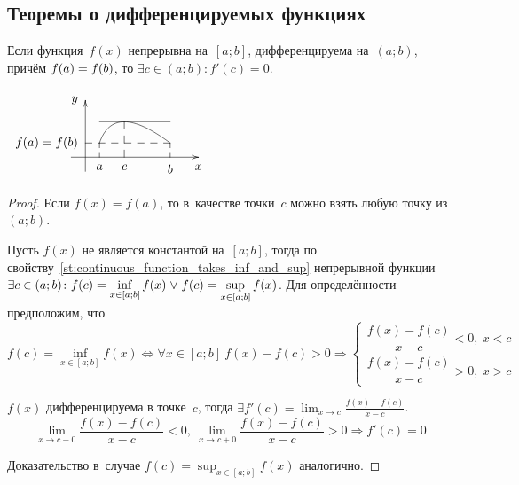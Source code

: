 \subsection{Теоремы о дифференцируемых функциях}
\begin{theorem}[Ролля]
Если функция~$f(x)$ непрерывна на~$[a; b]$, дифференцируема на~$(a; b)$, причём $f(a) \opbr= f(b)$, то $\exists c \in (a; b) \colon f'(c) = 0$.
\end{theorem}
\begin{center}
\noindent
$\begin{xy} /r8mm/:
(-0.5, 0); (4, 0) **@{-} *@{>} *++!U{x};
(0, -0.5); (0, 2) **@{-} *@{>} *++!R{y};
(0.5, 0.5) = "a"; (3, 0.5) = "b" **\crv{(1, 2)};
"a"; (0.5, 0) **@{--} *++!U{a};
"b"; (3, 0) **@{--} *++!U{b};
"b"; (0, 0.5) **@{--} *++!R{f(a) = f(b)};
(0.5, 1.2515); (3, 1.2515) **@{-};
(1.377, 1.2515); (1.377, 0) **@{--} *++!U{c};
\end{xy}$
\end{center}
\begin{proof}
Если $f(x) = f(a)$, то в~качестве точки~$c$ можно взять любую точку из~$(a; b)$.

Пусть $f(x)$ не является константой на~$[a; b]$, тогда по свойству~\ref{st:continuous_function_takes_inf_and_sup} непрерывной функции $\displaystyle \exists c \in (a; b) \colon \allowbreak f(c) \opbr= \inf_{x \in [a; b]} f(x) \lOr f(c) = \sup_{x \in [a; b]} f(x)$.
Для определённости предположим, что
\begin{equation*}
f(c) = \inf_{x \in [a; b]} f(x) \Leftrightarrow
\forall x \in [a; b] \ f(x) - f(c) > 0 \Rightarrow
\begin{cases}
\dfrac{f(x) - f(c)}{x - c} < 0, \ x < c \\
\dfrac{f(x) - f(c)}{x - c} > 0, \ x > c
\end{cases}
\end{equation*}

$f(x)$ дифференцируема в точке~$c$, тогда $\displaystyle \exists f'(c) = \lim_{x \to c} \frac{f(x) - f(c)}{x - c}$.
\begin{equation*}
\lim_{x \to c-0} \frac{f(x) - f(c)}{x - c} < 0, \
\lim_{x \to c+0} \frac{f(x) - f(c)}{x - c} > 0 \Rightarrow
f'(c) = 0
\end{equation*}

Доказательство в~случае $\displaystyle f(c) = \sup_{x \in [a; b]} f(x)$ аналогично.
\end{proof}

